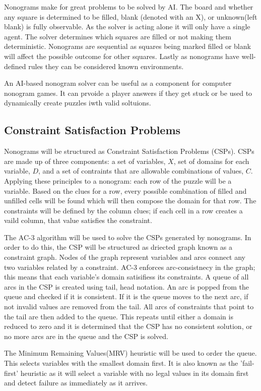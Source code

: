 \documentclass[12pt, letterpaper]
{article}
\begin{document}
    Nonograms make for great problems to be solved by AI. The board and whether any square is determined to be filled, blank (denoted with an X), or unknown(left blank) is fully observable. As the solver is acting alone it will only have a single agent. The solver determines which squares are filled or not making them deterministic. Nonograms are sequential as squares being marked filled or blank will affect the possible outcome for other squares. Lastly as nonograms have well-defined rules they can be considered known environments. 
    
    An AI-based nonogram solver can be useful as a component for computer nonogram games. It can prvoide a player answers if they get stuck or be used to dynamically create puzzles iwth valid soltuions.

    \subsection{Constraint Satisfaction Problems}
    Nonograms will be structured as Constraint Satisfaction Problems (CSPs). CSPs are made up of three components: a set of variables, $X$, set of domains for each variable, $D$, and a set of contraints that are allowable combinations of values, $C$. Applying these principles to a nonogram: each row of the puzzle will be a variable. Based on the clues for a row, every possible combination of filled and unfilled cells will be found which will then compose the domain for that row. The constraints will be defined by the column clues; if each cell in a row creates a vaild column, that value satisfies the constraint.

    The AC-3 algorithm will be used to solve the CSPs generated by nonograms. In order to do this, the CSP will be structured as  driected graph known as a constraint graph. Nodes of the graph represent variables and arcs connect any two variables related by a constraint. AC-3 enforces arc-consistnecy in the graph; this means that each variable's domain satisifiess its constraints. A queue of all arcs in the CSP is created using tail, head notation. An arc is popped from the queue and checked if it is consistent. If it is the queue moves to the next arc, if not invalid values are removed from the tail. All arcs of constraints that point to the tail are then added to the queue. This repeats until either a domain is reduced to zero and it is determined that the CSP has no consistent solution, or no more arcs are in the queue and the CSP is solved.

    The Minimum Remaining Values(MRV) heuristic will be used to order the queue. This selects variables with the smallest domain first. It is also known as the 'fail-first' heuristic as it will select a variable with no legal values in its domain first and detect failure as immediately as it arrives.\cite{russell_artificial_2022}
\end{document}
